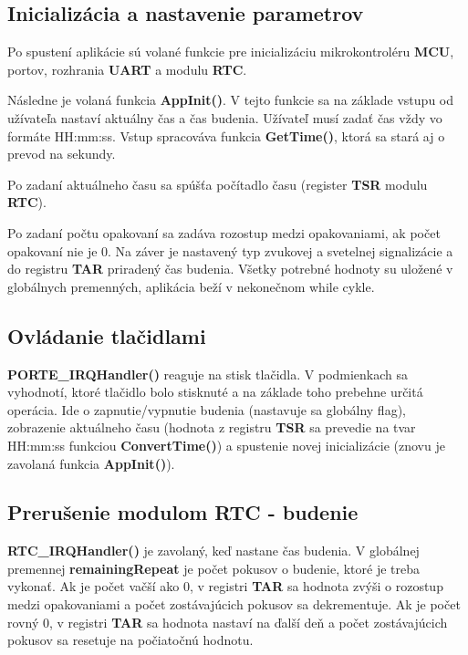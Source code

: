 \documentclass{article}
\begin{document}
        \subsection{Inicializácia a nastavenie parametrov}
        Po spustení aplikácie sú volané funkcie pre inicializáciu mikrokontroléru \textbf{MCU}, portov, rozhrania \textbf{UART} a modulu \textbf{RTC}.

        Následne je volaná funkcia \textbf{AppInit()}. V tejto funkcie sa na základe vstupu od užívateľa nastaví aktuálny čas a čas budenia.
        Užívateľ musí zadať čas vždy vo formáte HH:mm:ss. Vstup spracováva funkcia \textbf{GetTime()}, ktorá sa stará aj o prevod na sekundy.

        Po zadaní aktuálneho času sa spúšťa počítadlo času (register \textbf{TSR} modulu \textbf{RTC}).

        Po zadaní počtu opakovaní sa zadáva rozostup medzi opakovaniami, ak počet opakovaní nie je 0. Na záver je nastavený typ zvukovej a svetelnej signalizácie
        a do registru \textbf{TAR} priradený čas budenia. Všetky potrebné hodnoty su uložené v globálnych premenných, aplikácia beží v nekonečnom while cykle.

        \subsection{Ovládanie tlačidlami}
        \textbf{PORTE\_IRQHandler()} reaguje na stisk tlačidla. V podmienkach sa vyhodnotí, ktoré tlačidlo bolo stisknuté a na základe toho prebehne určitá operácia.
        Ide o zapnutie/vypnutie budenia (nastavuje sa globálny flag), zobrazenie aktuálneho času (hodnota z registru \textbf{TSR} sa prevedie na tvar HH:mm:ss
        funkciou \textbf{ConvertTime()}) a spustenie novej inicializácie (znovu je zavolaná funkcia \textbf{AppInit()}).

        \subsection{Prerušenie modulom RTC - budenie}
        \textbf{RTC\_IRQHandler()} je zavolaný, keď nastane čas budenia. V globálnej premennej \textbf{remainingRepeat} je počet pokusov o budenie, ktoré je treba vykonať.
        Ak je počet vačší ako 0, v registri \textbf{TAR} sa hodnota zvýši o rozostup medzi opakovaniami a počet zostávajúcich pokusov sa dekrementuje.
        Ak je počet rovný 0, v registri \textbf{TAR} sa hodnota nastaví na ďalší deň a počet zostávajúcich pokusov sa resetuje na počiatočnú hodnotu.
\end{document}
